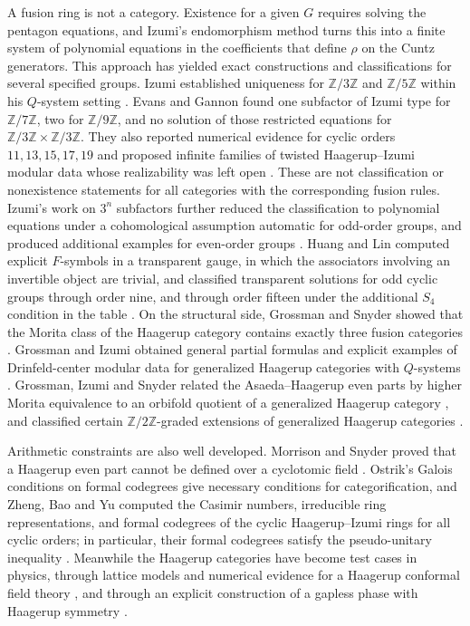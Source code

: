 \documentclass[11pt]{article}
\numberwithin{equation}{section}
\theoremstyle{definition}
\theoremstyle{remark}
\newcommand{\Z}{\mathbb Z}
\begin{document}
A fusion ring is not a category. Existence for a given $G$ requires
solving the pentagon equations, and Izumi's endomorphism method turns
this into a finite system of polynomial equations in the coefficients
that define $\rho$ on the Cuntz generators. This approach has yielded
exact constructions and classifications for several specified groups.
Izumi established uniqueness for $\Z/3\Z$ and $\Z/5\Z$ within his
$Q$-system setting \cite{Izumi2}. Evans and Gannon found one subfactor
of Izumi type for $\Z/7\Z$, two for $\Z/9\Z$, and no solution of
those restricted equations for $\Z/3\Z\times\Z/3\Z$. They also
reported numerical evidence for cyclic orders $11,13,15,17,19$ and
proposed infinite families of twisted Haagerup--Izumi modular data
whose realizability was left open \cite{EG2011}. These are not
classification or nonexistence statements for all categories with the
corresponding fusion rules. Izumi's work on $3^n$ subfactors further
reduced the classification to polynomial equations under a
cohomological assumption automatic for odd-order groups, and produced
additional examples for even-order groups \cite{Izumi2018}.
Huang and Lin computed explicit $F$-symbols in a transparent gauge, in
which the associators involving an invertible object are trivial, and
classified transparent solutions for odd cyclic groups through order
nine, and through order fifteen under the additional $S_4$ condition
in the table \cite{HL}. On the structural side, Grossman and Snyder showed
that the Morita class of the Haagerup category contains exactly three
fusion categories \cite{GS}. Grossman and Izumi obtained general
partial formulas and explicit examples of Drinfeld-center modular data
for generalized Haagerup categories with $Q$-systems \cite{GI}.
Grossman, Izumi and Snyder related the Asaeda--Haagerup even parts by
higher Morita equivalence to an orbifold quotient of a generalized
Haagerup category \cite{GIS}, and classified certain
$\Z/2\Z$-graded extensions of generalized Haagerup categories
\cite{GIS2}.

Arithmetic constraints are also well developed. Morrison and Snyder
proved that a Haagerup even part cannot be defined over a cyclotomic
field \cite{MS}. Ostrik's Galois conditions on formal codegrees
\cite{OstrikFC} give necessary conditions for categorification, and
Zheng, Bao and Yu computed the Casimir numbers, irreducible ring
representations, and formal codegrees of the cyclic Haagerup--Izumi rings
for all cyclic orders; in particular, their formal codegrees satisfy
the pseudo-unitary inequality \cite{ZBY}. Meanwhile the Haagerup categories
have become test cases in physics, through lattice models and numerical
evidence for a Haagerup conformal field theory \cite{HLOTT,Vanhove},
and through an explicit construction of a gapless phase with Haagerup
symmetry \cite{Bottini}.
\end{document}
